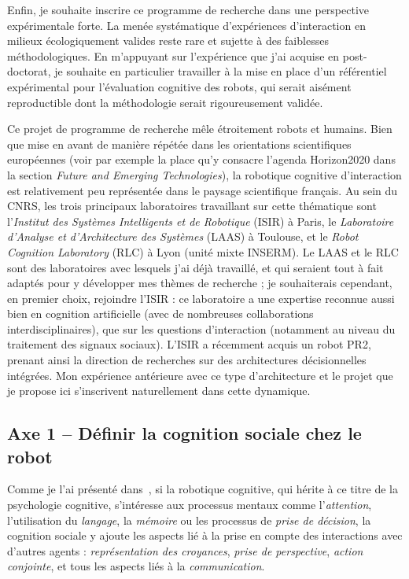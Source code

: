 \documentclass[a4paper]{article}
\begin{document}
Enfin, je souhaite inscrire ce programme de recherche dans une perspective
expérimentale forte. La menée systématique d'expériences d'interaction en
milieux écologiquement valides reste rare et sujette à des faiblesses
méthodologiques. En m'appuyant sur l'expérience que j'ai acquise en
post-doctorat, je souhaite en particulier travailler à la mise en place d'un
référentiel expérimental pour l'évaluation cognitive des robots, qui serait
aisément reproductible dont la méthodologie serait rigoureusement validée.

Ce projet de programme de recherche mêle étroitement robots et humains. Bien que
mise en avant de manière répétée dans les orientations scientifiques européennes
(voir par exemple la place qu'y consacre l'agenda Horizon2020 dans la section
\emph{Future and Emerging Technologies}), la robotique cognitive d'interaction
est relativement peu représentée dans le paysage scientifique français. Au sein
du CNRS, les trois principaux laboratoires travaillant sur cette thématique sont
l'\emph{Institut des Systèmes Intelligents et de Robotique} (ISIR) à Paris, le
\emph{Laboratoire d'Analyse et d'Architecture des Systèmes} (LAAS) à Toulouse,
et le \emph{Robot Cognition Laboratory} (RLC) à Lyon (unité mixte INSERM). Le
LAAS et le RLC sont des laboratoires avec lesquels j'ai déjà travaillé, et qui
seraient tout à fait adaptés pour y développer mes thèmes de recherche ; je
souhaiterais cependant, en premier choix, rejoindre l'ISIR : ce laboratoire a
une expertise reconnue aussi bien en cognition artificielle (avec de nombreuses
collaborations interdisciplinaires), que sur les questions d'interaction
(notamment au niveau du traitement des signaux sociaux). L'ISIR a récemment
acquis un robot PR2, prenant ainsi la direction de recherches sur des
architectures décisionnelles intégrées. Mon expérience antérieure avec ce type
d'architecture et le projet que je propose ici s'inscrivent naturellement dans
cette dynamique.

\subsection*{Axe 1 -- Définir la cognition sociale chez le robot}

Comme je l'ai présenté dans~\cite{lemaignan2014human}, si la robotique
cognitive, qui hérite à ce titre de la psychologie cognitive, s'intéresse aux
processus mentaux comme l'\emph{attention}, l'utilisation du \emph{langage}, la
\emph{mémoire} ou les processus de \emph{prise de décision}, la cognition
sociale y ajoute les aspects lié à la prise en compte des interactions avec
d'autres agents : \emph{représentation des croyances}, \emph{prise de
perspective}, \emph{action conjointe}, et tous les aspects liés à la
\emph{communication}.
\end{document}
